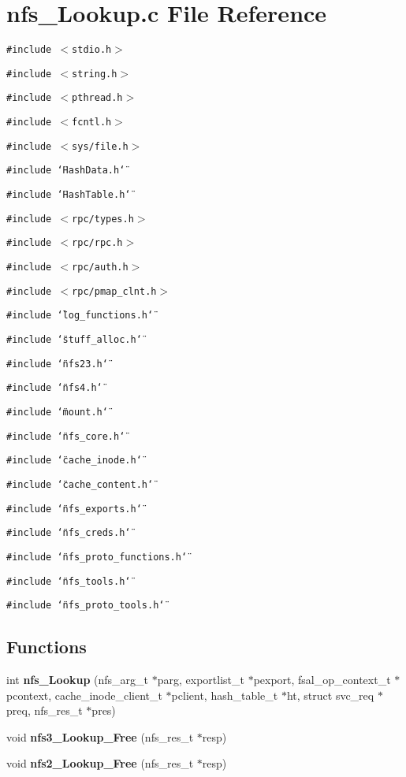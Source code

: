 \section{nfs\_\-Lookup.c File Reference}
\label{nfs__Lookup_8c}
{\tt \#include $<$stdio.h$>$}\par
{\tt \#include $<$string.h$>$}\par
{\tt \#include $<$pthread.h$>$}\par
{\tt \#include $<$fcntl.h$>$}\par
{\tt \#include $<$sys/file.h$>$}\par
{\tt \#include \char`\"{}Hash\-Data.h\char`\"{}}\par
{\tt \#include \char`\"{}Hash\-Table.h\char`\"{}}\par
{\tt \#include $<$rpc/types.h$>$}\par
{\tt \#include $<$rpc/rpc.h$>$}\par
{\tt \#include $<$rpc/auth.h$>$}\par
{\tt \#include $<$rpc/pmap\_\-clnt.h$>$}\par
{\tt \#include \char`\"{}log\_\-functions.h\char`\"{}}\par
{\tt \#include \char`\"{}stuff\_\-alloc.h\char`\"{}}\par
{\tt \#include \char`\"{}nfs23.h\char`\"{}}\par
{\tt \#include \char`\"{}nfs4.h\char`\"{}}\par
{\tt \#include \char`\"{}mount.h\char`\"{}}\par
{\tt \#include \char`\"{}nfs\_\-core.h\char`\"{}}\par
{\tt \#include \char`\"{}cache\_\-inode.h\char`\"{}}\par
{\tt \#include \char`\"{}cache\_\-content.h\char`\"{}}\par
{\tt \#include \char`\"{}nfs\_\-exports.h\char`\"{}}\par
{\tt \#include \char`\"{}nfs\_\-creds.h\char`\"{}}\par
{\tt \#include \char`\"{}nfs\_\-proto\_\-functions.h\char`\"{}}\par
{\tt \#include \char`\"{}nfs\_\-tools.h\char`\"{}}\par
{\tt \#include \char`\"{}nfs\_\-proto\_\-tools.h\char`\"{}}\par
\subsection*{Functions}
\begin{CompactItemize}
\item 
int {\bf nfs\_\-Lookup} (nfs\_\-arg\_\-t $\ast$parg, exportlist\_\-t $\ast$pexport, fsal\_\-op\_\-context\_\-t $\ast$pcontext, cache\_\-inode\_\-client\_\-t $\ast$pclient, hash\_\-table\_\-t $\ast$ht, struct svc\_\-req $\ast$preq, nfs\_\-res\_\-t $\ast$pres)
\item 
void {\bf nfs3\_\-Lookup\_\-Free} (nfs\_\-res\_\-t $\ast$resp)
\item 
void {\bf nfs2\_\-Lookup\_\-Free} (nfs\_\-res\_\-t $\ast$resp)
\end{CompactItemize}



